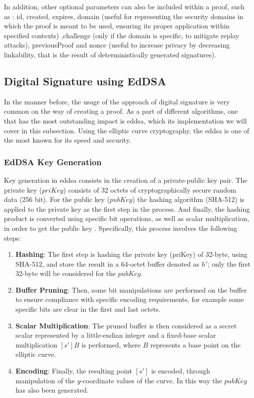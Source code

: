 In addition, other optional parameters can also be included within a proof, such as \cite{VCDataIntegrity}: id, created, expires, domain (useful for representing the security domains in which the 
proof is meant to be used, ensuring its proper application within specified contexts) ,challenge (only if the domain is specific, to mitigate replay attacks), previousProof 
and nonce (useful to increase privacy by decreasing linkability, that is the result of deterministically generated signatures).

\subsection{Digital Signature using EdDSA}

In the manner before, the usage of the approach of digital signature is very common on the way of creating a proof. As a part of different algorithms, one that has the most 
outstanding impact is \gls{eddsa}, which its implementation we will cover in this subsection. Using the elliptic curve cryptography, the \gls{eddsa} is one of the most known for its 
speed and security.

\subsubsection{EdDSA Key Generation}

Key generation in \gls{eddsa} consists in the creation of a private-public key pair. The private key ($priKey$) consists of 32 octets of cryptographically secure random data 
(256 bit). For the public key ($pubKey$) the hashing algorithm (SHA-512) is applied to the private key as the first step in the process. And finally, the hashing product is 
converted using specific bit operations, as well as scalar multiplication, in order to get the public key \cite{10054286}. Specifically, this process involves the following steps:

\begin{enumerate}
  \item \textbf{Hashing}: The first step is hashing the private key (priKey) of 32-byte, using SHA-512, and store the result in a 64-octet buffer denoted as $h'$; only the 
  first 32-byte will be considered for the $pubKey$.
  \item \textbf{Buffer Pruning}: Then, some bit manipulations are performed on the buffer to ensure compliance with specific encoding requirements, for example some specific
  bits are clear in the first and last octets.
  \item \textbf{Scalar Multiplication}: The pruned buffer is then considered as a secret scalar represented by a little-endian integer and a fixed-base scalar multiplication
  $[s']B$ is performed, where $B$ represents a base point on the elliptic curve. 
  \item \textbf{Encoding}: Finally, the resulting point $[s']$ is encoded, through manipulation of the $y$-coordinate values of the curve. In this way the $pubKey$ has also 
  been generated.
\end{enumerate}

